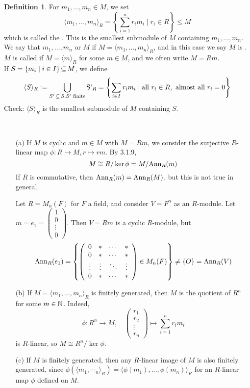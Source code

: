 \documentclass[11pt]{book}
\theoremstyle{definition}   \newtheorem{defn}[counter]{Definition} %
\newcommand{\mymatrix}[2]{\left( \begin{array}{#1} #2 \end{array} \right)}
\newcommand{\gen}[1]{\langle #1 \rangle}   \newcommand{\stab}[2]{\tn{Stab}_{#1}(#2)}   \newcommand{\fix}[2]{\tn{Fix}_{#1}(#2)}   \newcommand{\op}{^{\tn{op}}}
\newcommand{\ann}[2]{\textnormal{Ann}_{#1}(#2)}   \newcommand{\rk}{\textnormal{rk}}
\DeclareMathOperator{\ra}{\rightarrow}   \DeclareMathOperator{\Poly}{\mathbf{P}}   \DeclareMathOperator{\spn}{\textnormal{span}}   \DeclareMathOperator{\aut}{\textnormal{Aut}}
\newcommand{\vs}{\vspace{8pt}}
\numberwithin{counter}{chapter}
\begin{document}
\vs

\begin{defn}
For $m_1,\dots,m_n \in M$, we set
	\[\gen{m_1,\dots,m_n}_R = \left\{\sum_{i=1}^n r_i m_i \mid r_i \in R \right\} \leq M \]
which is called the . This is the smallest submodule of $M$ containing $m_1,\dots,m_n$. We say that $m_1,\dots,m_n$  or  $M$ if $M = \gen{m_1,\dots,m_n}_R$, and in this case we say $M$ is . $M$ is called  if $M = \gen{m}_R$ for some $m \in M$, and we often write $M = Rm$. \\

If $S = \{m_i \mid i \in I\} \operatorname{\subseteq} M$, we define
	\[\gen{S}_R := \bigcup_{S' \sub S, S' \tn{ finite}} \tn{S'}_R = \left\{\sum_{i \in I} r_i m_i \mid \tn{all } r_i \in R, \tn{ almost all $r_i = 0$} \right\} \]
Check: $\gen{S}_R$ is the smallest submodule of $M$ containing $S$.
\end{defn}

\vs


\begin{remark}\
\begin{enumerate}
\item[(a)] If $M$ is cyclic and $m \in M$ with $M = Rm$, we consider the surjective $R$-linear map $\phi : R \ra M, r \mapsto rm$. By 3.1.9,
	\[M \cong R/ \ker \phi = M/ \ann{R}{m} \]
If $R$ is commutative, then $\ann{R}{m} = \ann{R}{M}$, but this is not true in general.

\begin{example*}
Let $R = M_n(F)$ for $F$ a field, and consider $V = F^n$ as an $R$-module. Let $m = e_1 = \mymatrix{c}{1 \\ 0 \\ \vdots \\ 0}$. Then $V = Rm$ is a cyclic $R$-module, but
	\[\ann{R}{e_1} = \left\{\mymatrix{cccc}{0 & \ast & \cdots & \ast \\ 0 & \ast & \cdots & \ast \\ \vdots & \vdots & \ddots & \vdots \\ 0 & \ast & \cdots & \ast} \in M_n(F) \right\} \ne \{O\} = \ann{R}{V} \]
\end{example*}
\item[(b)] If $M = \gen{m_1,\dots,m_n}_R$ is finitely generated, then $M$ is the quotient of $R^n$ for some $m \in \operatorname{\mathbb{N}}$. Indeed,
	\[\phi : R^n \ra M, \quad \mymatrix{c}{r_1 \\ r_2 \\ \vdots \\ r_n} \mapsto \sum_{i=1}^n r_i m_i \]
is $R$-linear, so $M \cong R^n / \ker \phi$.

\item[(c)] If $M$ is finitely generated, then any $R$-linear image of $M$ is also finitely generated, since $\phi(\gen{m_1,\dotsm_n}_R) = \gen{\phi(m_1),\dots,\phi(m_n)}_R$ for an $R$-linear map $\phi$ defined on $M$.
\end{enumerate}
\end{remark}
\end{document}
